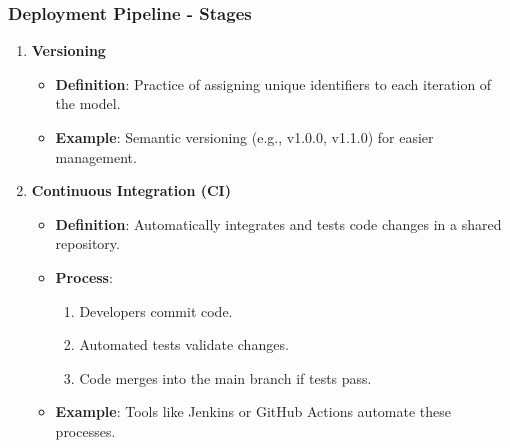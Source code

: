 \documentclass[aspectratio=169]{beamer}
\begin{document}
\begin{frame}[fragile]
    \frametitle{Deployment Pipeline - Stages}
    \begin{enumerate}
        \item \textbf{Versioning}
        \begin{itemize}
            \item \textbf{Definition}: Practice of assigning unique identifiers to each iteration of the model.
            \item \textbf{Example}: Semantic versioning (e.g., v1.0.0, v1.1.0) for easier management.
        \end{itemize}
        
        \item \textbf{Continuous Integration (CI)}
        \begin{itemize}
            \item \textbf{Definition}: Automatically integrates and tests code changes in a shared repository.
            \item \textbf{Process}:
            \begin{enumerate}
                \item Developers commit code.
                \item Automated tests validate changes.
                \item Code merges into the main branch if tests pass.
            \end{enumerate}
            \item \textbf{Example}: Tools like Jenkins or GitHub Actions automate these processes.
        \end{itemize}
    \end{enumerate}
\end{frame}
\end{document}
